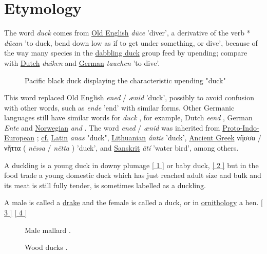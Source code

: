 \documentclass[11pt,a4paper]{article}
\begin{document}
\section{Etymology}

The word \textit{duck} comes from \href{/wiki/Old\_English}{Old English} \textit{dūce} 'diver', a derivative of the verb * \textit{dūcan} 'to duck, bend down low as if to get under something, or dive', because of the way many species in the \href{/wiki/Dabbling\_duck}{dabbling duck} group feed by upending; compare with \href{/wiki/Dutch\_language}{Dutch} \textit{duiken} and \href{/wiki/German\_language}{German} \textit{tauchen} 'to dive'.

\begin{figure}[h]
\caption{Pacific black duck displaying the characteristic upending "duck"}
\end{figure}

This word replaced Old English \textit{ened} / \textit{ænid} 'duck', possibly to avoid confusion with other words, such as \textit{ende} 'end' with similar forms. Other Germanic languages still have similar words for \textit{duck} , for example, Dutch \textit{eend} , German \textit{Ente} and \href{/wiki/Norwegian\_language}{Norwegian} \textit{and} . The word \textit{ened} / \textit{ænid} was inherited from \href{/wiki/Proto-Indo-European\_language}{Proto-Indo-European} ; \href{/wiki/Cf.}{cf.} \href{/wiki/Latin}{Latin} \textit{anas} "duck", \href{/wiki/Lithuanian\_language}{Lithuanian} \textit{ántis} 'duck', \href{/wiki/Ancient\_Greek\_language}{Ancient Greek} νῆσσα / νῆττα ( \textit{nēssa} / \textit{nētta} ) 'duck', and \href{/wiki/Sanskrit}{Sanskrit} \textit{ātí} 'water bird', among others.

A duckling is a young duck in downy plumage \href{\#cite\_note-1}{[ 1 ]} or baby duck, \href{\#cite\_note-2}{[ 2 ]} but in the food trade a young domestic duck which has just reached adult size and bulk and its meat is still fully tender, is sometimes labelled as a duckling.

A male is called a \href{https://en.wiktionary.org/wiki/drake}{drake} and the female is called a duck, or in \href{/wiki/Ornithology}{ornithology} a hen. \href{\#cite\_note-3}{[ 3 ]} \href{\#cite\_note-4}{[ 4 ]}

\begin{figure}[h]
\caption{Male mallard .}
\end{figure}

\begin{figure}[h]
\caption{Wood ducks .}
\end{figure}
\end{document}
